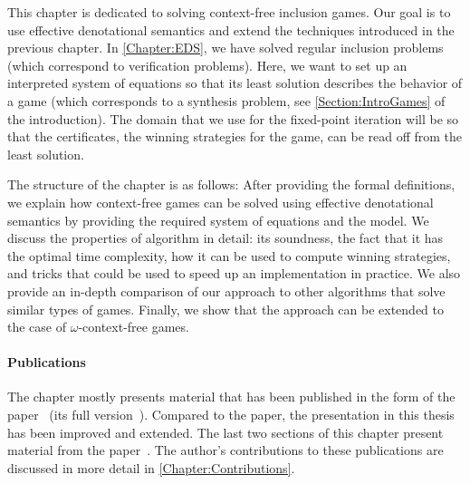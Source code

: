 \documentclass[../../diss.tex]{subfiles}
\begin{document}
This chapter is dedicated to solving context-free inclusion games.
Our goal is to use effective denotational semantics and extend the techniques introduced in the previous chapter.
In \cref{Chapter:EDS}, we have solved regular inclusion problems (which correspond to verification problems).
Here, we want to set up an interpreted system of equations so that its least solution describes the behavior of a game (which corresponds to a synthesis problem, see \cref{Section:IntroGames} of the introduction).
The domain that we use for the fixed-point iteration will be so that the certificates, the winning strategies for the game, can be read off from the least solution.

The structure of the chapter is as follows:
After providing the formal definitions, we explain how context-free games can be solved using effective denotational semantics by providing the required system of equations and the model.
We discuss the properties of algorithm in detail: its soundness, the fact that it has the optimal time complexity, how it can be used to compute winning strategies, and tricks that could be used to speed up an implementation in practice.
We also provide an in-depth comparison of our approach to other algorithms that solve similar types of games.
Finally, we show that the approach can be extended to the case of $\omega$-context-free games.

\paragraph{Publications}

The chapter mostly presents material that has been published in the form of the paper~\cite{HolikMM16} (\resp its full version~\cite{HolikMM16a}).
Compared to the paper, the presentation in this thesis has been improved and extended.
The last two sections of this chapter present material from the paper~\cite{MeyerMN17a}.
The author's contributions to these publications are discussed in more detail in \cref{Chapter:Contributions}.
\end{document}
